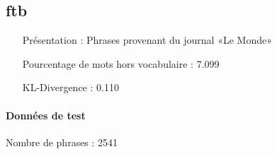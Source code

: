 \subsection{ftb } 
 \begin{itemize} 
 \item[Présentation :] Phrases provenant du journal «Le Monde»

 \item[Pourcentage de mots hors vocabulaire : ]7.099
 \item[KL-Divergence :]0.110
 \end{itemize}  \paragraph{Données de test \\ }  
 Nombre de phrases : 2541\\ 
